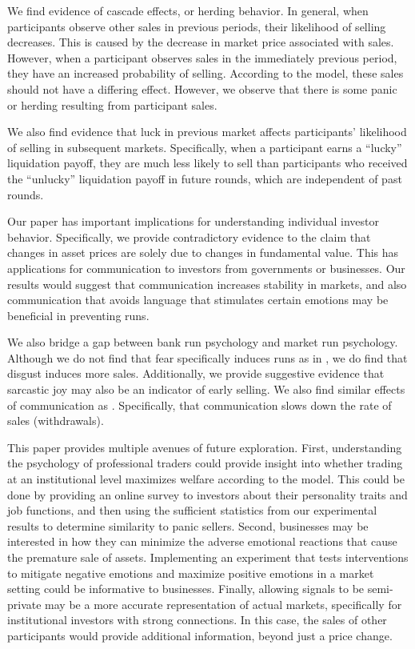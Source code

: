 \documentclass[thesis]{uathesis}
\begin{document}
\begin{body}
We find evidence of cascade effects, or herding behavior. In general, when participants observe other sales in previous periods, their likelihood of selling decreases. This is caused by the decrease in market price associated with sales. However, when a participant observes sales in the immediately previous period, they have an increased probability of selling. According to the model, these sales should not have a differing effect. However, we observe that there is some panic or herding resulting from participant sales.

We also find evidence that luck in previous market affects participants' likelihood of selling in subsequent markets. Specifically, when a participant earns a ``lucky'' liquidation payoff, they are much less likely to sell than participants who received the ``unlucky'' liquidation payoff in future rounds, which are independent of past rounds.

Our paper has important implications for understanding individual investor behavior. Specifically, we provide contradictory evidence to the claim that changes in asset prices are solely due to changes in fundamental value. This has applications for communication to investors from governments or businesses. Our results would suggest that communication increases stability in markets, and also communication that avoids language that stimulates certain emotions may be beneficial in preventing runs.

We also bridge a gap between bank run psychology and market run psychology. Although we do not find that fear specifically induces runs as in \cite{dijk2017bank}, we do find that disgust induces more sales. Additionally, we provide suggestive evidence that sarcastic joy may also be an indicator of early selling. We also find similar effects of communication as \cite{shakina2018coordination}. Specifically, that communication slows down the rate of sales (withdrawals).

This paper provides multiple avenues of future exploration. First, understanding the psychology of professional traders could provide insight into whether trading at an institutional level maximizes welfare according to the model. This could be done by providing an online survey to investors about their personality traits and job functions, and then using the sufficient statistics from our experimental results to determine similarity to panic sellers. Second, businesses may be interested in how they can minimize the adverse emotional reactions that cause the premature sale of assets. Implementing an experiment that tests interventions to mitigate negative emotions and maximize positive emotions in a market setting could be informative to businesses. Finally, allowing signals to be semi-private may be a more accurate representation of actual markets, specifically for institutional investors with strong connections. In this case, the sales of other participants would provide additional information, beyond just a price change.



\end{body}
\end{document}
